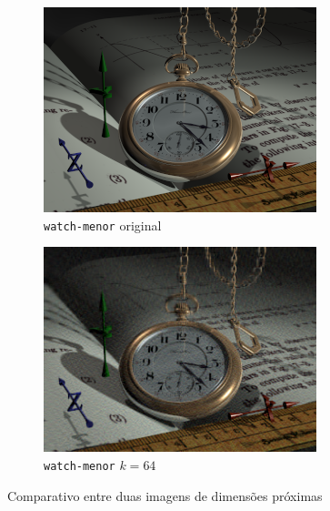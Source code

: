 \documentclass[brazilian,a4paper,twocolumn]{article}
\begin{document}
\begin{figure}[H]
            \begin{subfigure}{0.23\textwidth}
                \includegraphics[width=\textwidth,keepaspectratio]{watch-menor}
                \caption{\texttt{watch-menor} original}
                \label{fig:watch-menor-original}
            \end{subfigure}
            \begin{subfigure}{0.23\textwidth}
                \includegraphics[width=\textwidth,keepaspectratio]{watch-menor-64}
                \caption{\texttt{watch-menor} $k=64$}
                \label{fig:watch-menor-64}
            \end{subfigure}

            \caption{Comparativo entre duas imagens de dimensões próximas}
            \label{fig:comparativo-watch-menor-monalisa}
        \end{figure}
\end{document}
